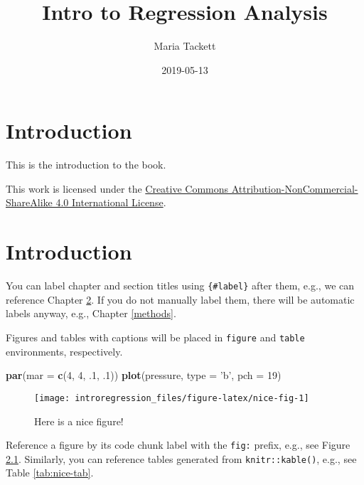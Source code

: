 \documentclass[]{book}
\title{Intro to Regression Analysis}
\author{Maria Tackett}
\date{2019-05-13}
\newenvironment{Shaded}{\begin{snugshade}}{\end{snugshade}}
\newcommand{\KeywordTok}[1]{\textcolor[rgb]{0.13,0.29,0.53}{\textbf{#1}}}
\newcommand{\DataTypeTok}[1]{\textcolor[rgb]{0.13,0.29,0.53}{#1}}
\newcommand{\DecValTok}[1]{\textcolor[rgb]{0.00,0.00,0.81}{#1}}
\newcommand{\StringTok}[1]{\textcolor[rgb]{0.31,0.60,0.02}{#1}}
\newcommand{\NormalTok}[1]{#1}
\begin{document}
\maketitle

{
\hypersetup{linkcolor=black}
\setcounter{tocdepth}{1}
\tableofcontents
}
\listoftables
\listoffigures
\chapter{Introduction}\label{introduction}

This is the introduction to the book.

This work is licensed under the
\href{http://creativecommons.org/licenses/by-nc-sa/4.0/}{Creative
Commons Attribution-NonCommercial-ShareAlike 4.0 International License}.

\chapter{Introduction}\label{intro}

You can label chapter and section titles using \texttt{\{\#label\}}
after them, e.g., we can reference Chapter \ref{intro}. If you do not
manually label them, there will be automatic labels anyway, e.g.,
Chapter \ref{methods}.

Figures and tables with captions will be placed in \texttt{figure} and
\texttt{table} environments, respectively.

\begin{Shaded}
\begin{Highlighting}[]
\KeywordTok{par}\NormalTok{(}\DataTypeTok{mar =} \KeywordTok{c}\NormalTok{(}\DecValTok{4}\NormalTok{, }\DecValTok{4}\NormalTok{, .}\DecValTok{1}\NormalTok{, .}\DecValTok{1}\NormalTok{))}
\KeywordTok{plot}\NormalTok{(pressure, }\DataTypeTok{type =} \StringTok{'b'}\NormalTok{, }\DataTypeTok{pch =} \DecValTok{19}\NormalTok{)}
\end{Highlighting}
\end{Shaded}

\begin{figure}

{\centering \texttt{[image: introregression\_files/figure-latex/nice-fig-1]} 

}

\caption{Here is a nice figure!}\label{fig:nice-fig}
\end{figure}

Reference a figure by its code chunk label with the \texttt{fig:}
prefix, e.g., see Figure \ref{fig:nice-fig}. Similarly, you can
reference tables generated from \texttt{knitr::kable()}, e.g., see Table
\ref{tab:nice-tab}.
\end{document}
